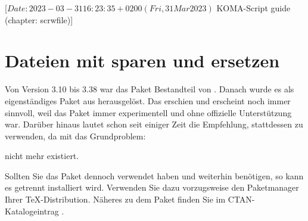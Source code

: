 %
%
%
%
%
%
%

                 [$Date: 2023-03-31 16:23:35 +0200 (Fri, 31 Mar 2023) $
                  KOMA-Script guide (chapter: scrwfile)]

\chapter{Dateien mit  sparen und ersetzen}

\BeginIndexGroup
{}%
Von Version 3.10 bis 3.38 war das Paket
\href{https://www.ctan.org/pkg/scrwfile}{} Bestandteil von
\KOMAScript. Danach wurde es als eigenständiges Paket aus \KOMAScript{}
herausgelöst. Das erschien und erscheint noch immer sinnvoll, weil das Paket
immer experimentell und ohne offizielle Unterstützung war. Darüber hinaus
lautet schon seit einiger Zeit die Empfehlung, stattdessen \LuaLaTeX{} zu
verwenden, da mit \LuaLaTeX{} das Grundproblem:
nicht mehr existiert.

Sollten Sie das Paket dennoch verwendet haben und weiterhin benötigen, so kann
es getrennt installiert wird. Verwenden Sie dazu vorzugsweise den Paketmanager
Ihrer \TeX-Distribution. Näheres zu dem Paket finden Sie im
CTAN-Katalogeintrag \cite{package:scrwfile}.%
\EndIndexGroup


